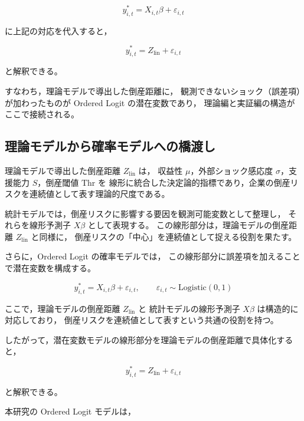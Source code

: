 \[
y^*_{i,t} = X_{i,t}\beta + \varepsilon_{i,t}
\]



に上記の対応を代入すると，



\[
y^*_{i,t} = Z_{\text{lin}} + \varepsilon_{i,t}
\]



と解釈できる。

すなわち，理論モデルで導出した倒産距離に，
観測できないショック（誤差項）が加わったものが Ordered Logit の潜在変数であり，
理論編と実証編の構造がここで接続される。


\subsection{理論モデルから確率モデルへの橋渡し}

理論モデルで導出した倒産距離 $Z_{\text{lin}}$ は，
収益性 $\mu$，外部ショック感応度 $\sigma$，支援能力 $S$，倒産閾値 $\mathrm{Thr}$ を
線形に統合した決定論的指標であり，企業の倒産リスクを連続値として表す理論的尺度である。

統計モデルでは，倒産リスクに影響する要因を観測可能変数として整理し，
それらを線形予測子 $X\beta$ として表現する。
この線形部分は，理論モデルの倒産距離 $Z_{\text{lin}}$ と同様に，
倒産リスクの「中心」を連続値として捉える役割を果たす。

さらに，Ordered Logit の確率モデルでは，
この線形部分に誤差項を加えることで潜在変数を構成する。



\[
y^*_{i,t} = X_{i,t}\beta + \varepsilon_{i,t},
\qquad
\varepsilon_{i,t} \sim \text{Logistic}(0,1)
\]



ここで，理論モデルの倒産距離 $Z_{\text{lin}}$ と
統計モデルの線形予測子 $X\beta$ は構造的に対応しており，
倒産リスクを連続値として表すという共通の役割を持つ。

したがって，潜在変数モデルの線形部分を理論モデルの倒産距離で具体化すると，



\[
y^*_{i,t} = Z_{\text{lin}} + \varepsilon_{i,t}
\]



と解釈できる。

本研究の Ordered Logit モデルは，

